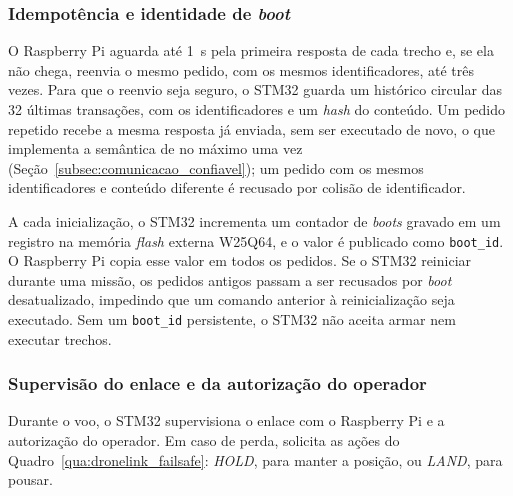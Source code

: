 \subsubsection{Idempotência e identidade de \textit{boot}}\label{subsubsec:com_idempotencia}

O Raspberry Pi aguarda até 1~s pela primeira resposta de cada trecho e, se ela não chega, reenvia o mesmo pedido, com os mesmos identificadores, até três vezes. Para que o reenvio seja seguro, o STM32 guarda um histórico circular das 32 últimas transações, com os identificadores e um \textit{hash} do conteúdo. Um pedido repetido recebe a mesma resposta já enviada, sem ser executado de novo, o que implementa a semântica de no máximo uma vez (Seção~\ref{subsec:comunicacao_confiavel}); um pedido com os mesmos identificadores e conteúdo diferente é recusado por colisão de identificador.

A cada inicialização, o STM32 incrementa um contador de \textit{boots} gravado em um registro na memória \textit{flash} externa W25Q64, e o valor é publicado como \texttt{boot\_id}. O Raspberry Pi copia esse valor em todos os pedidos. Se o STM32 reiniciar durante uma missão, os pedidos antigos passam a ser recusados por \textit{boot} desatualizado, impedindo que um comando anterior à reinicialização seja executado. Sem um \texttt{boot\_id} persistente, o STM32 não aceita armar nem executar trechos.

\subsubsection{Supervisão do enlace e da autorização do operador}\label{subsubsec:com_supervisao}

Durante o voo, o STM32 supervisiona o enlace com o Raspberry Pi e a autorização do operador. Em caso de perda, solicita as ações do Quadro~\ref{qua:dronelink_failsafe}: \textit{HOLD}, para manter a posição, ou \textit{LAND}, para pousar.
  

